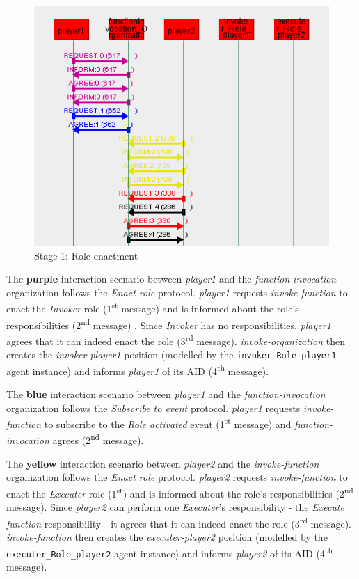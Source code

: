 \begin{figure}[H]
	\centering
	\includegraphics[width=\textwidth]{images/examples/example1-stage1.png}
	\caption{Stage 1: Role enactment}
	\label{figure:example1-stage1}
\end{figure}

The \textbf{purple} interaction scenario between \textit{player1} and the \textit{function-invocation} organization follows the \textit{Enact role} protocol.
\textit{player1} requests \textit{invoke-function} to enact the \textit{Invoker} role (1\textsuperscript{st} message) and is informed about the role's responsibilities (2\textsuperscript{nd} message) .
Since \textit{Invoker} has no responsibilities, \textit{player1} agrees that it can indeed enact the role (3\textsuperscript{rd} message).
\textit{invoke-organization} then creates the \textit{invoker-player1} position (modelled by the \texttt{invoker\_Role\_player1} agent instance) and informs \textit{player1} of its AID (4\textsuperscript{th} message).

The \textbf{blue} interaction scenario between \textit{player1} and the \textit{function-invocation} organization follows the \textit{Subscribe to event} protocol.
\textit{player1} requests \textit{invoke-function} to subscribe to the \textit{Role activated} event (1\textsuperscript{st} message) and \textit{function-invocation} agrees (2\textsuperscript{nd} message).

The \textbf{yellow} interaction scenario between \textit{player2} and the \textit{invoke-function} organization follows the \textit{Enact role} protocol.
\textit{player2} requests \textit{invoke-function} to enact the \textit{Executer} role (1\textsuperscript{st}) and is informed about the role's responsibilities (2\textsuperscript{nd} message).
Since \textit{player2} can perform one \textit{Executer}'s responsibility - the \textit{Execute function} responsibility - it agrees that it can indeed enact the role (3\textsuperscript{rd} message).
\textit{invoke-function} then creates the \textit{executer-player2} position (modelled by the \texttt{executer\_Role\_player2} agent instance) and informs \textit{player2} of its AID (4\textsuperscript{th} message).

